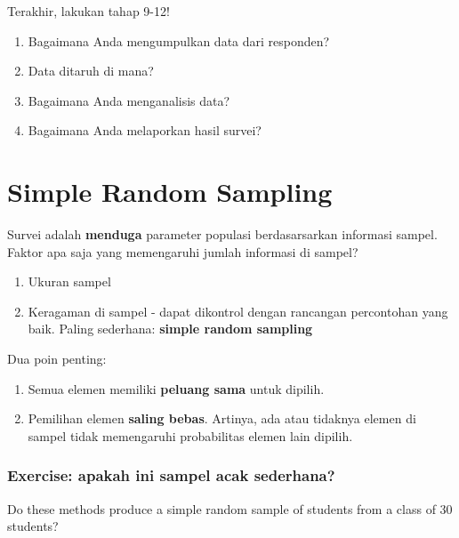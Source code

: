 \documentclass[
  letterpaper,
  DIV=11,
  numbers=noendperiod]{scrreprt}
\providecommand{\tightlist}{%
  \setlength{\itemsep}{0pt}\setlength{\parskip}{0pt}}\usepackage{longtable,booktabs,array}
\begin{document}
Terakhir, lakukan tahap 9-12!

\begin{enumerate}
\def\labelenumi{\arabic{enumi}.}
\setcounter{enumi}{8}
\tightlist
\item
  Bagaimana Anda mengumpulkan data dari responden?
\item
  Data ditaruh di mana?
\item
  Bagaimana Anda menganalisis data?
\item
  Bagaimana Anda melaporkan hasil survei?
\end{enumerate}


\hypertarget{simple-random-sampling}{%
\chapter{Simple Random Sampling}\label{simple-random-sampling}}

Survei adalah \textbf{menduga} parameter populasi berdasarsarkan
informasi sampel. Faktor apa saja yang memengaruhi jumlah informasi di
sampel?

\begin{enumerate}
\def\labelenumi{\arabic{enumi}.}
\tightlist
\item
  Ukuran sampel
\item
  Keragaman di sampel - dapat dikontrol dengan rancangan percontohan
  yang baik. Paling sederhana: \textbf{simple random sampling}
\end{enumerate}

Dua poin penting:

\begin{enumerate}
\def\labelenumi{\arabic{enumi}.}
\tightlist
\item
  Semua elemen memiliki \textbf{peluang sama} untuk dipilih.
\item
  Pemilihan elemen \textbf{saling bebas}. Artinya, ada atau tidaknya
  elemen di sampel tidak memengaruhi probabilitas elemen lain dipilih.
\end{enumerate}

\hypertarget{exercise-apakah-ini-sampel-acak-sederhana}{%
\subsection{Exercise: apakah ini sampel acak
sederhana?}\label{exercise-apakah-ini-sampel-acak-sederhana}}

Do these methods produce a simple random sample of students from a class
of 30 students?
\end{document}

